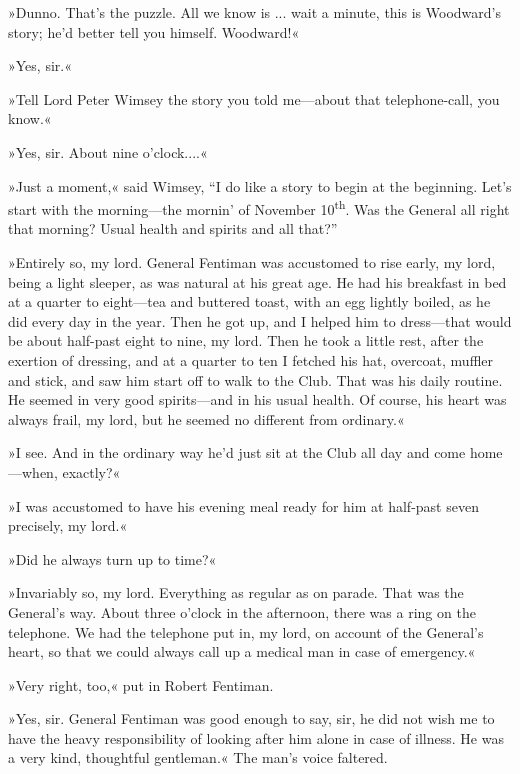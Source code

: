 »Dunno. That's the puzzle. All we know is ... wait a minute, this is Woodward's story; he'd better tell you himself. Woodward!«

»Yes, sir.«

»Tell Lord Peter Wimsey the story you told me\allowbreak---\allowbreak about that telephone-call, you know.«

»Yes, sir. About nine o'clock....«

»Just a moment,« said Wimsey, \enquote{I do like a story to begin at the beginning. Let's start with the morning\allowbreak---\allowbreak the mornin' of November  10\textsuperscript{th}. Was the General all right that morning? Usual health and spirits and all that?}

»Entirely so, my lord. General Fentiman was accustomed to rise early, my lord, being a light sleeper, as was natural at his great age. He had his breakfast in bed at a quarter to eight\allowbreak---\allowbreak tea and buttered toast, with an egg lightly boiled, as he did every day in the year. Then he got up, and I helped him to dress\allowbreak---\allowbreak that would be about half-past eight to nine, my lord. Then he took a little rest, after the exertion of dressing, and at a quarter to ten I fetched his hat, overcoat, muffler and stick, and saw him start off to walk to the Club. That was his daily routine. He seemed in very good spirits\allowbreak---\allowbreak and in his usual health. Of course, his heart was always frail, my lord, but he seemed no different from ordinary.«

»I see. And in the ordinary way he'd just sit at the Club all day and come home\allowbreak---\allowbreak when, exactly?«

»I was accustomed to have his evening meal ready for him at half-past seven precisely, my lord.«

»Did he always turn up to time?«

»Invariably so, my lord. Everything as regular as on parade. That was the General's way. About three o'clock in the afternoon, there was a ring on the telephone. We had the telephone put in, my lord, on account of the General's heart, so that we could always call up a medical man in case of emergency.«

»Very right, too,« put in Robert Fentiman.

»Yes, sir. General Fentiman was good enough to say, sir, he did not wish me to have the heavy responsibility of looking after him alone in case of illness. He was a very kind, thoughtful gentleman.« The man's voice faltered.

